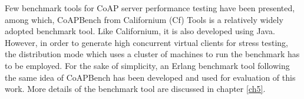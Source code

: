 
Few benchmark tools for CoAP server performance testing have been presented, among which, CoAPBench from Californium (Cf) Tools \cite{coapbench} is a relatively widely adopted benchmark tool. Like Californium, it is also developed using Java. However, in order to generate high concurrent virtual clients for stress testing, the distribution mode which uses a cluster of machines to run the benchmark has to be employed. For the sake of simplicity, an Erlang benchmark tool following the same idea of CoAPBench has been developed and used for evaluation of this work. More details of the benchmark tool are discussed in chapter \autoref{ch5}.
